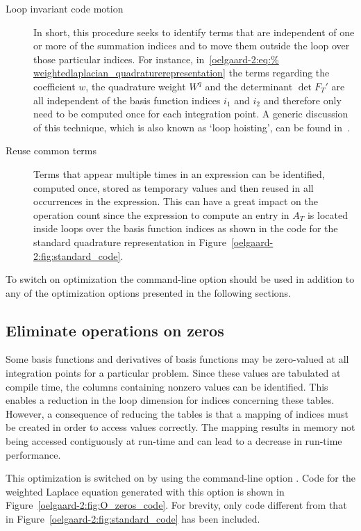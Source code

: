 \begin{description}
\item[Loop invariant code motion] In short, this procedure seeks to
identify terms that are independent of one or more of the summation
indices and to move them outside the loop over those particular
indices.  For instance, in~\eqref{oelgaard-2:eq:%
weightedlaplacian_quadraturerepresentation} the terms regarding the
coefficient $w$, the quadrature weight $W^q$ and the determinant $\det
F_T'$ are all independent of the basis function indices $i_1$ and
$i_2$ and therefore only need to be computed once for each integration
point.  A generic discussion of this technique, which is also known as
`loop hoisting', can be found in~\citet{AhoSethiUllman1986}.

\item[Reuse common terms] Terms that appear multiple times in an
  expression can be identified, computed once, stored as temporary
  values and then reused in all occurrences in the expression.  This can
  have a great impact on the operation count since the expression to
  compute an entry in $A_T$ is located inside loops over the basis
  function indices as shown in the code for the standard quadrature
  representation in Figure~\ref{oelgaard-2:fig:standard_code}.
\end{description}

To switch on optimization the command-line option  should be
used in addition to any of the \ffc{} optimization options presented
in the following sections.

\subsection{Eliminate operations on zeros}
\label{oelgaard-2:sec:eliminate_zeros}

Some basis functions and derivatives of basis functions may be
zero-valued at all integration points for a particular problem.  Since
these values are tabulated at compile time, the columns containing
nonzero values can be identified.  This enables a reduction in the
loop dimension for indices concerning these tables.  However, a
consequence of reducing the tables is that a mapping of indices must
be created in order to access values correctly.  The mapping results
in memory not being accessed contiguously at run-time and can lead to a
decrease in run-time performance.

This optimization is switched on by using the command-line option
. Code for the weighted Laplace equation
generated with this option is shown in
Figure~\ref{oelgaard-2:fig:O_zeros_code}. For brevity, only code
different from that in Figure~\ref{oelgaard-2:fig:standard_code} has
been included.

